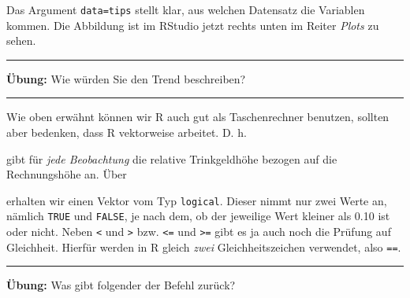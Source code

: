 \documentclass[12pt,ngerman,paper=a4,pagesize,DIV=13]{scrreprt}
\newenvironment{Shaded}{\begin{snugshade}}{\end{snugshade}}
\newcommand{\FloatTok}[1]{\textcolor[rgb]{0.00,0.00,0.81}{#1}}
\newcommand{\NormalTok}[1]{#1}
\newcommand{\OperatorTok}[1]{\textcolor[rgb]{0.81,0.36,0.00}{\textbf{#1}}}
\newcommand{\StringTok}[1]{\textcolor[rgb]{0.31,0.60,0.02}{#1}}
\begin{document}
Das Argument \texttt{data=tips} stellt klar, aus welchen Datensatz die
Variablen kommen. Die Abbildung ist im RStudio jetzt rechts unten im
Reiter \emph{Plots} zu sehen.

\begin{center}\rule{0.5\linewidth}{\linethickness}\end{center}

\textbf{Übung:} Wie würden Sie den Trend beschreiben?

\begin{center}\rule{0.5\linewidth}{\linethickness}\end{center}

Wie oben erwähnt können wir R auch gut als Taschenrechner benutzen,
sollten aber bedenken, dass R vektorweise arbeitet. D. h.

\begin{Shaded}
\end{Shaded}

gibt für \emph{jede Beobachtung} die relative Trinkgeldhöhe bezogen auf
die Rechnungshöhe an. Über

\begin{Shaded}
\end{Shaded}

erhalten wir einen Vektor vom Typ \texttt{logical}. Dieser nimmt nur
zwei Werte an, nämlich \texttt{TRUE} und \texttt{FALSE}, je nach dem, ob
der jeweilige Wert kleiner als 0.10 ist oder nicht. Neben
\texttt{\textless{}} und \texttt{\textgreater{}} bzw.
\texttt{\textless{}=} und \texttt{\textgreater{}=} gibt es ja auch noch
die Prüfung auf Gleichheit. Hierfür werden in R gleich \emph{zwei}
Gleichheitszeichen verwendet, also \texttt{==}.

\begin{center}\rule{0.5\linewidth}{\linethickness}\end{center}

\textbf{Übung:} Was gibt folgender der Befehl zurück?

\begin{Shaded}
\end{Shaded}
\end{document}
